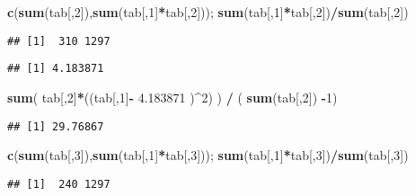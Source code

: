 \documentclass[]{article}
\newenvironment{Shaded}{\begin{snugshade}}{\end{snugshade}}
\newcommand{\KeywordTok}[1]{\textcolor[rgb]{0.13,0.29,0.53}{\textbf{#1}}}
\newcommand{\DecValTok}[1]{\textcolor[rgb]{0.00,0.00,0.81}{#1}}
\newcommand{\FloatTok}[1]{\textcolor[rgb]{0.00,0.00,0.81}{#1}}
\newcommand{\StringTok}[1]{\textcolor[rgb]{0.31,0.60,0.02}{#1}}
\newcommand{\OperatorTok}[1]{\textcolor[rgb]{0.81,0.36,0.00}{\textbf{#1}}}
\newcommand{\NormalTok}[1]{#1}
\begin{document}
\begin{Shaded}
\begin{Highlighting}[]
\KeywordTok{c}\NormalTok{(}\KeywordTok{sum}\NormalTok{(tab[,}\DecValTok{2}\NormalTok{]),}\KeywordTok{sum}\NormalTok{(tab[,}\DecValTok{1}\NormalTok{]}\OperatorTok{*}\NormalTok{tab[,}\DecValTok{2}\NormalTok{]));    }\KeywordTok{sum}\NormalTok{(tab[,}\DecValTok{1}\NormalTok{]}\OperatorTok{*}\NormalTok{tab[,}\DecValTok{2}\NormalTok{])}\OperatorTok{/}\KeywordTok{sum}\NormalTok{(tab[,}\DecValTok{2}\NormalTok{])}
\end{Highlighting}
\end{Shaded}

\begin{verbatim}
## [1]  310 1297
\end{verbatim}

\begin{verbatim}
## [1] 4.183871
\end{verbatim}

\begin{Shaded}
\begin{Highlighting}[]
\KeywordTok{sum}\NormalTok{( tab[,}\DecValTok{2}\NormalTok{]}\OperatorTok{*}\NormalTok{((tab[,}\DecValTok{1}\NormalTok{]}\OperatorTok{-}\StringTok{ }\FloatTok{4.183871}\NormalTok{ )}\OperatorTok{^}\DecValTok{2}\NormalTok{) ) }\OperatorTok{/}\StringTok{ }\NormalTok{( }\KeywordTok{sum}\NormalTok{(tab[,}\DecValTok{2}\NormalTok{]) }\OperatorTok{-}\DecValTok{1}\NormalTok{)}
\end{Highlighting}
\end{Shaded}

\begin{verbatim}
## [1] 29.76867
\end{verbatim}

\begin{Shaded}
\begin{Highlighting}[]
\KeywordTok{c}\NormalTok{(}\KeywordTok{sum}\NormalTok{(tab[,}\DecValTok{3}\NormalTok{]),}\KeywordTok{sum}\NormalTok{(tab[,}\DecValTok{1}\NormalTok{]}\OperatorTok{*}\NormalTok{tab[,}\DecValTok{3}\NormalTok{]));    }\KeywordTok{sum}\NormalTok{(tab[,}\DecValTok{1}\NormalTok{]}\OperatorTok{*}\NormalTok{tab[,}\DecValTok{3}\NormalTok{])}\OperatorTok{/}\KeywordTok{sum}\NormalTok{(tab[,}\DecValTok{3}\NormalTok{])}
\end{Highlighting}
\end{Shaded}

\begin{verbatim}
## [1]  240 1297
\end{verbatim}
\end{document}
